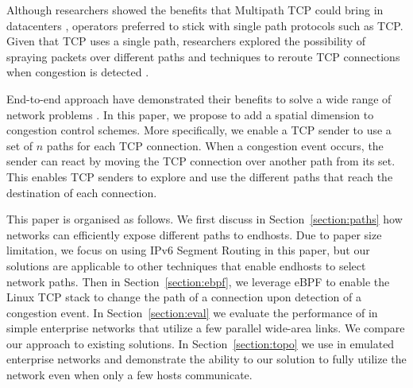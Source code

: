 Although researchers showed the benefits that Multipath TCP could bring in datacenters \cite{raiciu2011improving}, operators preferred to stick with single path protocols such as TCP. Given that TCP uses a single path, researchers explored the possibility of spraying packets over different paths \cite{dixit2013impact} and techniques to reroute TCP connections when congestion is detected \cite{kabbani2014flowbender}. 

End-to-end approach have demonstrated their benefits to solve a wide range of network problems \cite{saltzer1984end}. In this paper, we propose to add a spatial dimension to congestion control schemes. More specifically, we enable a TCP sender to use a set of $n$ paths for each TCP connection. When a congestion event occurs, the sender can react by moving the TCP connection over another path from its set. This enables TCP senders to explore and use the different paths that reach the destination of each connection.

This paper is organised as follows. We first discuss in Section~\ref{section:paths} how networks can efficiently expose different paths to endhosts. Due to paper size limitation, we focus on using IPv6 Segment Routing \cite{previdi2017ipv6} in this paper, but our solutions are applicable to other techniques that enable endhosts to select network paths. Then in Section~\ref{section:ebpf}, we leverage eBPF to enable the Linux TCP stack to change the path of a connection upon detection of a congestion event. In Section~\ref{section:eval} we evaluate the performance of \pathchanger{} in simple enterprise networks that utilize a few parallel wide-area links. We compare our approach to existing solutions. In Section~\ref{section:topo} we use \pathchanger{} in emulated enterprise networks and demonstrate the ability to our solution to fully utilize the network even when only a few hosts communicate.